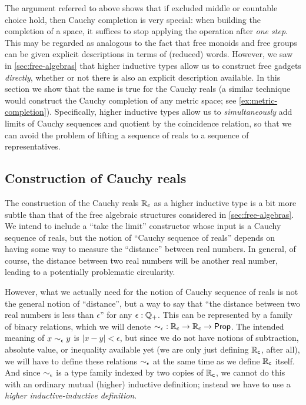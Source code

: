 The argument referred to above shows that if excluded middle or countable choice hold, then Cauchy completion is very special: when building the completion of a space, it suffices to stop applying the operation after \emph{one step}.
This may be regarded as analogous to the fact that free monoids and free groups can be given explicit descriptions in terms of (reduced) words.
However, we saw in \autoref{sec:free-algebras} that higher inductive types allow us to construct free gadgets \emph{directly}, whether or not there is also an explicit description available.
In this section we show that the same is true for the Cauchy reals (a similar technique would construct the Cauchy completion of any metric space; see \autoref{ex:metric-completion}).
Specifically, higher inductive types allow us to \emph{simultaneously} add limits of Cauchy sequences and quotient by the coincidence relation, so that we can avoid the problem of lifting a sequence of reals to a sequence of representatives.


\subsection{Construction of Cauchy reals}
\label{sec:constr-cauchy-reals}

The construction of the Cauchy reals $\mathbb{R}_\mathsf{c}$ as a higher inductive type is a bit more subtle than that of the free algebraic structures considered in \autoref{sec:free-algebras}.
We intend to include a ``take the limit'' constructor whose input is a Cauchy sequence of reals, but the notion of ``Cauchy sequence of reals'' depends on having some way to measure the ``distance'' between real numbers.
In general, of course, the distance between two real numbers will be another real number, leading to a potentially problematic circularity.

However, what we actually need for the notion of Cauchy sequence of reals is not the general notion of ``distance'', but a way to say that ``the distance between two real numbers is less than $\epsilon$'' for any $\epsilon:\mathbb{Q}_{+}$.
This can be represented by a family of binary relations, which we will denote $\mathord{\sim_{\epsilon}} : \mathbb{R}_\mathsf{c}\to\mathbb{R}_\mathsf{c}\to \mathsf{Prop}$.
The intended meaning of $x \sim_{\epsilon} y$ is $|x - y| < \epsilon$, but since we do not have notions of subtraction, absolute value, or inequality available yet (we are only just defining $\mathbb{R}_\mathsf{c}$, after all), we will have to define these relations $\sim_{\epsilon}$ at the same time as we define $\mathbb{R}_\mathsf{c}$ itself.
And since $\sim_{\epsilon}$ is a type family indexed by two copies of $\mathbb{R}_\mathsf{c}$, we cannot do this with an ordinary mutual (higher) inductive definition; instead we have to use a \emph{higher inductive-inductive definition}.

